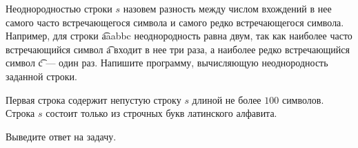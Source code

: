 Неоднородностью строки $s$ назовем разность между числом вхождений в нее самого часто встречающегося символа и самого редко встречающегося символа. 
Например, для строки \t{aaabbc} неоднородность равна двум, так как наиболее часто встречающийся символ \t{a} входит в нее три раза, а наиболее редко встречающийся символ \t{c} --- один раз. 
Напишите программу, вычисляющую неоднородность заданной строки. 

\InputFile

Первая строка содержит непустую строку $s$ длиной не более $100$ символов. Строка $s$ состоит только из строчных букв латинского алфавита. 

\OutputFile

Выведите ответ на задачу. 

\SAMPLES
